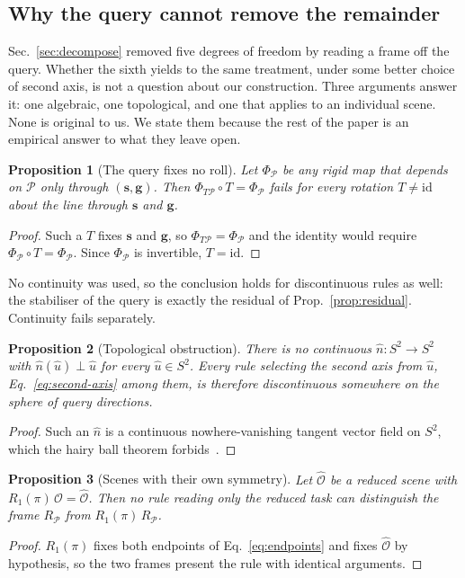\documentclass[conference]{IEEEtran}
\newcommand{\svec}{\mathbf{s}}
\newcommand{\gvec}{\mathbf{g}}
\newtheorem{proposition}{Proposition}
\begin{document}
\subsection{Why the query cannot remove the remainder}
\label{sec:obstruction}
Sec.~\ref{sec:decompose} removed five degrees of freedom by reading a frame off
the query. Whether the sixth yields to the same treatment, under some better
choice of second axis, is not a question about our construction. Three
arguments answer it: one algebraic, one topological, and one that applies to an
individual scene. None is original to us. We state them because the rest of the
paper is an empirical answer to what they leave open.

\begin{proposition}[The query fixes no roll]
\label{prop:stabiliser}
Let $\Phi_{\mathcal{P}}$ be any rigid map that depends on $\mathcal{P}$ only
through $(\svec, \gvec)$. Then $\Phi_{T\mathcal{P}} \circ T = \Phi_{\mathcal{P}}$
fails for every rotation $T \neq \mathrm{id}$ about the line through $\svec$ and
$\gvec$.
\end{proposition}
\begin{proof}
Such a $T$ fixes $\svec$ and $\gvec$, so $\Phi_{T\mathcal{P}} = \Phi_{\mathcal{P}}$
and the identity would require $\Phi_{\mathcal{P}} \circ T = \Phi_{\mathcal{P}}$.
Since $\Phi_{\mathcal{P}}$ is invertible, $T = \mathrm{id}$.
\end{proof}

No continuity was used, so the conclusion holds for discontinuous rules as well:
the stabiliser of the query is exactly the residual of
Prop.~\ref{prop:residual}. Continuity fails separately.

\begin{proposition}[Topological obstruction]
\label{prop:two}
There is no continuous $\hat{n} : S^2 \to S^2$ with $\hat{n}(\hat{u}) \perp
\hat{u}$ for every $\hat{u} \in S^2$. Every rule selecting the second axis from
$\hat{u}$, Eq.~\eqref{eq:second-axis} among them, is therefore discontinuous
somewhere on the sphere of query directions.
\end{proposition}
\begin{proof}
Such an $\hat{n}$ is a continuous nowhere-vanishing tangent vector field on
$S^2$, which the hairy ball theorem forbids~\cite{milnor1978hairy}.
\end{proof}

\begin{proposition}[Scenes with their own symmetry]
\label{prop:three}
Let $\hat{\mathcal{O}}$ be a reduced scene with
$R_1(\pi)\,\hat{\mathcal{O}} = \hat{\mathcal{O}}$. Then no rule reading only the
reduced task can distinguish the frame $R_{\mathcal{P}}$ from
$R_1(\pi)\,R_{\mathcal{P}}$.
\end{proposition}
\begin{proof}
$R_1(\pi)$ fixes both endpoints of Eq.~\eqref{eq:endpoints} and fixes
$\hat{\mathcal{O}}$ by hypothesis, so the two frames present the rule with
identical arguments.
\end{proof}
\end{document}
